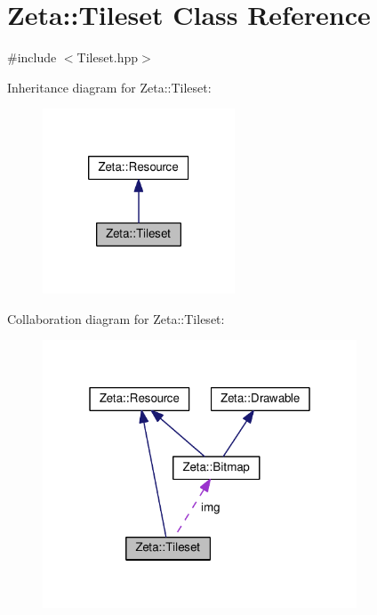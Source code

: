 \hypertarget{classZeta_1_1Tileset}{\section{Zeta\+:\+:Tileset Class Reference}
\label{classZeta_1_1Tileset}
}


{\ttfamily \#include $<$Tileset.\+hpp$>$}



Inheritance diagram for Zeta\+:\+:Tileset\+:\nopagebreak
\begin{figure}[H]
\begin{center}
\leavevmode
\includegraphics[width=162pt]{classZeta_1_1Tileset__inherit__graph}
\end{center}
\end{figure}


Collaboration diagram for Zeta\+:\+:Tileset\+:\nopagebreak
\begin{figure}[H]
\begin{center}
\leavevmode
\includegraphics[width=265pt]{classZeta_1_1Tileset__coll__graph}
\end{center}
\end{figure}
